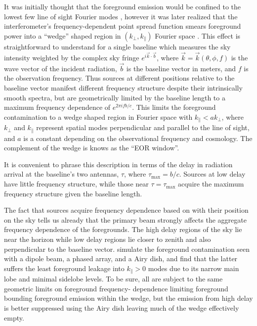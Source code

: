 \documentclass{emulateapj}
\begin{document}
It was initially thought that the foreground emission would be confined to the lowest few 
line of sight Fourier modes \citep[e.g.,][]{MoralesBowmanHewittFGsub}, however it was later realized that the  
interferometer's frequency-dependent point spread function smears foreground power into a ``wedge'' shaped 
region in  $(k_\perp,k_\parallel)$ Fourier space \citep{Dattapowerspec,X13, PoberWedge,MoralesPSShapes, VedanthamWedge, nithya13, CathWedge, AdrianWedge1, AdrianWedge2}. This effect is straightforward to understand for a single baseline which measures the sky intensity weighted by the complex sky fringe 
$e^{i \vec{k}\cdot\vec{b}}$, where $\vec{k}=\vec{k}(\theta,\phi,f)$ is the wave vector of 
the incident radiation, $\vec{b}$ is the baseline vector in meters, and $f$ is the observation frequency. Thus sources at different positions relative to the baseline vector manifest different 
frequency structure despite their intrinsically smooth spectra, but are geometrically limited 
by the baseline length to a maximum frequency dependence of  $e^{2\pi i f b/c}$. This limits the foreground contamination 
to a wedge shaped region in Fourier space with $k_\parallel<a k_\perp$, where $k_\perp$ and $k_\parallel$ represent spatial modes 
perpendicular and parallel to the line of sight, and $a$ is a constant depending on the observational frequency and cosmology. The complement of the wedge is knows as the ``EOR window''.

It is convenient to phrase this description in terms 
of the delay in radiation arrival at the baseline's two antennas, $\tau$, where $\tau_
\text{max}=b/c$. Sources at low delay have little frequency 
structure, while those near $\tau=\tau_\text{max}$ acquire the maximum frequency 
structure given the baseline length. 

The fact that sources acquire frequency dependence based on with their position on the sky 
tells us already that the primary beam strongly affects the aggregate frequency dependence 
of the foregrounds. The high delay regions of the sky lie near the horizon while low delay 
regions lie closer to zenith and also perpendicular to the baseline vector. \citet{nithya15} 
simulate the foreground contamination seen with a dipole beam, a phased array, and a Airy dish,
and find that the latter suffers the least foreground leakage into
 $k_\parallel>0$ modes due to its narrow main lobe and minimal sidelobe 
levels. To be sure, all are subject to the same geometric limits on foreground frequency-
dependence limiting foreground bounding foreground emission within the wedge, but the emission from high delay is better suppressed using the 
Airy dish leaving much of the wedge effectively empty. 
\end{document}

